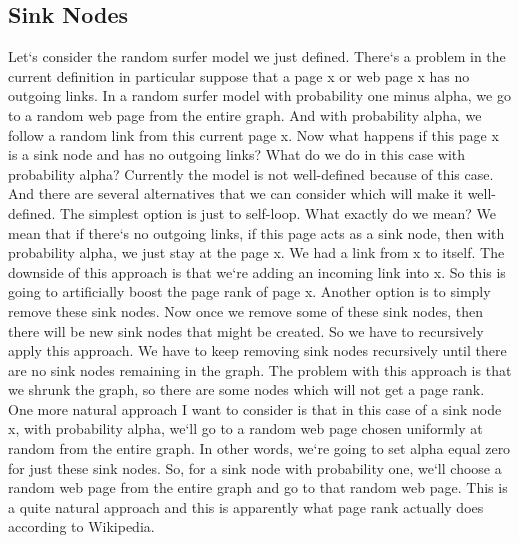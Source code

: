 \subsection{Sink Nodes}
Let`s consider the random surfer model we just defined.
There`s a problem in the current definition in particular suppose that a page x or web page x has no outgoing links.
In a random surfer model with probability one minus alpha, we go to a random web page from the entire graph.
And with probability alpha, we follow a random link from this current page x.
Now what happens if this page x is a sink node and has no outgoing links? What do we do in this case with probability alpha? Currently the model is not well-defined because of this case.
And there are several alternatives that we can consider which will make it well-defined.
The simplest option is just to self-loop.
What exactly do we mean? We mean that if there`s no outgoing links, if this page acts as a sink node, then with probability alpha, we just stay at the page x.
We had a link from x to itself.
The downside of this approach is that we`re adding an incoming link into x.
So this is going to artificially boost the page rank of page x.
Another option is to simply remove these sink nodes.
Now once we remove some of these sink nodes, then there will be new sink nodes that might be created.
So we have to recursively apply this approach.
We have to keep removing sink nodes recursively until there are no sink nodes remaining in the graph.
The problem with this approach is that we shrunk the graph, so there are some nodes which will not get a page rank.
One more natural approach I want to consider is that in this case of a sink node x, with probability alpha, we`ll go to a random web page chosen uniformly at random from the entire graph.
In other words, we`re going to set alpha equal zero for just these sink nodes.
So, for a sink node with probability one, we`ll choose a random web page from the entire graph and go to that random web page.
This is a quite natural approach and this is apparently what page rank actually does according to Wikipedia.

